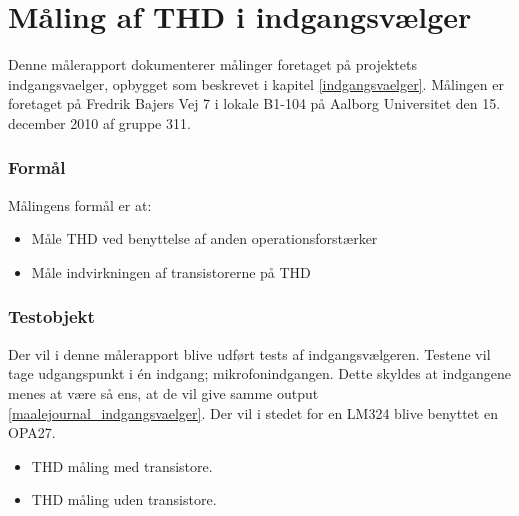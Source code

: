\chapter{Måling af THD i indgangsvælger}
\label{maalejournal_indgangsvaelger_2}

Denne målerapport dokumenterer målinger foretaget på projektets indgangsvaelger, opbygget som beskrevet i kapitel \ref{indgangsvaelger}. Målingen er foretaget på Fredrik Bajers Vej 7 i lokale B1-104 på Aalborg Universitet den 15. december 2010 af gruppe 311.

\subsection*{Formål}
Målingens formål er at:
\begin{itemize}
\item Måle THD ved benyttelse af anden operationsforstærker
\item Måle indvirkningen af transistorerne på THD
\end{itemize}

\subsection*{Testobjekt}
Der vil i denne målerapport blive udført tests af indgangsvælgeren. Testene vil tage udgangspunkt i én indgang; mikrofonindgangen. Dette skyldes at indgangene menes at være så ens, at de vil give samme output \ref{maalejournal_indgangsvaelger}. Der vil i stedet for en LM324 blive benyttet en OPA27.
\begin{itemize}
\item THD måling med transistore.
\item THD måling uden transistore.
\end{itemize}

